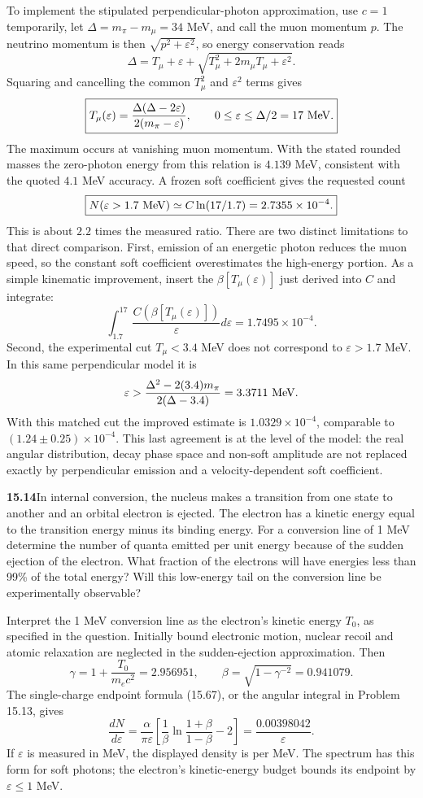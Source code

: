 To implement the stipulated perpendicular-photon approximation, use
$c=1$ temporarily, let $\Delta=m_\pi-m_\mu=34$ MeV, and call the
muon momentum $p$.  The neutrino momentum is then
$\sqrt{p^2+\varepsilon^2}$, so energy conservation reads
\[
\Delta=T_\mu+\varepsilon+\sqrt{T_\mu^2+2m_\mu T_\mu+\varepsilon^2}.
\]
Squaring and cancelling the common $T_\mu^2$ and $\varepsilon^2$
terms gives
\[
\boxed{T_\mu(\varepsilon)
=\frac{\Delta(\Delta-2\varepsilon)}{2(m_\pi-\varepsilon)},
\qquad 0\leq\varepsilon\leq\Delta/2=17\ {\rm MeV}.}
\]
The maximum occurs at vanishing muon momentum.  With the stated
rounded masses the zero-photon energy from this relation is
$4.139$ MeV, consistent with the quoted $4.1$ MeV accuracy.
A frozen soft coefficient gives the requested count
\[
\boxed{N(\varepsilon>1.7\ {\rm MeV})
\simeq C\ln(17/1.7)=2.7355\times10^{-4}.}
\]
This is about $2.2$ times the measured ratio.  There are two distinct
limitations to that direct comparison.  First, emission of an
energetic photon reduces the muon speed, so the constant soft
coefficient overestimates the high-energy portion.  As a simple
kinematic improvement, insert the $\beta[T_\mu(\varepsilon)]$
just derived into $C$ and integrate:
\[
\int_{1.7}^{17}\frac{C(\beta[T_\mu(\varepsilon)])}{\varepsilon}
 d\varepsilon=1.7495\times10^{-4}.
\]
Second, the experimental cut $T_\mu<3.4$ MeV does not correspond
to $\varepsilon>1.7$ MeV.  In this same perpendicular model it is
\[
\varepsilon>\frac{\Delta^2-2(3.4)m_\pi}{2(\Delta-3.4)}
=3.3711\ {\rm MeV}.
\]
With this matched cut the improved estimate is
$1.0329\times10^{-4}$, comparable to
$(1.24\pm0.25)\times10^{-4}$.  This last agreement is at the level
of the model: the real angular distribution, decay phase space and
non-soft amplitude are not replaced exactly by perpendicular emission
and a velocity-dependent soft coefficient.


\par\bigskip
\noindent\textbf{15.14}\quad In internal conversion, the nucleus makes a transition from one state to another and an orbital electron is ejected. The electron has a kinetic energy equal to the transition energy minus its binding energy. For a conversion line of 1 MeV determine the number of quanta emitted per unit energy because of the sudden ejection of the electron. What fraction of the electrons will have energies less than 99\% of the total energy? Will this low-energy tail on the conversion line be experimentally observable?
\solution

Interpret the 1 MeV conversion line as the electron's kinetic energy
$T_0$, as specified in the question.  Initially bound electronic
motion, nuclear recoil and atomic relaxation are neglected in the
sudden-ejection approximation.  Then
\[
\gamma=1+\frac{T_0}{m_ec^2}=2.956951,
\qquad \beta=\sqrt{1-\gamma^{-2}}=0.941079.
\]
The single-charge endpoint formula (15.67), or the angular integral
in Problem 15.13, gives
\[
\boxed{\frac{dN}{d\varepsilon}
=\frac{\alpha}{\pi\varepsilon}
\left[\frac1\beta\ln\frac{1+\beta}{1-\beta}-2\right]
=\frac{0.00398042}{\varepsilon}.}
\]
If $\varepsilon$ is measured in MeV, the displayed density is per
MeV.  The spectrum has this form for soft photons; the electron's
kinetic-energy budget bounds its endpoint by $\varepsilon\leq1$ MeV.

